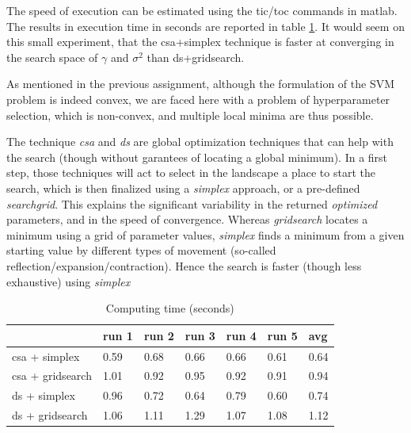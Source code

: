 \documentclass[11pt, a4paper]{article}
\begin{document}
The speed of execution can be estimated using the tic/toc commands in
matlab. The results in execution time in seconds are reported in table
\ref{tab:computing_param}. It would seem on this small experiment,
that the csa+simplex technique is faster at converging in the search
space of $\gamma$ and $\sigma^2$ than ds+gridsearch.

As mentioned in the previous assignment, although the formulation of
the SVM problem is indeed convex, we are faced here with a problem of
hyperparameter selection, which is non-convex, and multiple local
minima are thus possible. 

The technique \emph{csa} and \emph{ds} are global optimization
techniques that can help with the search (though without garantees of
locating a global minimum). In a first step, those techniques will act
to select in the landscape a place to start the search, which is then
finalized using a \emph{simplex} approach, or a pre-defined
\emph{searchgrid}. This explains the significant variability in the
returned \emph{optimized} parameters, and in the speed of
convergence. Whereas \emph{gridsearch} locates a minimum using a grid
of parameter values, \emph{simplex} finds a minimum from a given
starting value by different types of movement (so-called
reflection/expansion/contraction). Hence the search is faster (though
less exhaustive) using \emph{simplex}

\begin{table}[H]
  \centering
  \begin{tabular}{l|l|l|l|l|l|l|}
    \cline{2-7}
    & run 1 & run 2 & run 3 & run 4 & run 5 & avg  \\ \hline
    \multicolumn{1}{|l|}{csa + simplex}    & 0.59  & 0.68  & 0.66  & 0.66  & 0.61  & 0.64 \\ \hline
    \multicolumn{1}{|l|}{csa + gridsearch} & 1.01  & 0.92  & 0.95  & 0.92  & 0.91  & 0.94 \\ \hline
    \multicolumn{1}{|l|}{ds + simplex}     & 0.96  & 0.72  & 0.64  & 0.79  & 0.60  & 0.74 \\ \hline
    \multicolumn{1}{|l|}{ds + gridsearch}  & 1.06  & 1.11  & 1.29  & 1.07  & 1.08  & 1.12 \\ \hline
  \end{tabular}
  \caption{Computing time (seconds)}
  \label{tab:computing_param}
\end{table}

\end{document}
